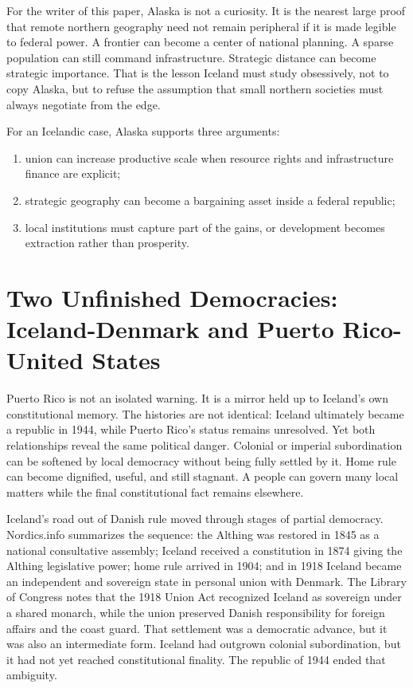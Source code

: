 \documentclass[11pt,a4paper]{article}
\begin{document}
For the writer of this paper, Alaska is not a curiosity. It is the nearest large proof that remote northern geography need not remain peripheral if it is made legible to federal power. A frontier can become a center of national planning. A sparse population can still command infrastructure. Strategic distance can become strategic importance. That is the lesson Iceland must study obsessively, not to copy Alaska, but to refuse the assumption that small northern societies must always negotiate from the edge.

For an Icelandic case, Alaska supports three arguments:

\begin{enumerate}
  \item union can increase productive scale when resource rights and infrastructure finance are explicit;
  \item strategic geography can become a bargaining asset inside a federal republic;
  \item local institutions must capture part of the gains, or development becomes extraction rather than prosperity.
\end{enumerate}

\section[Two Unfinished Democracies]{Two Unfinished Democracies: Iceland-Denmark and Puerto Rico-United States}
Puerto Rico is not an isolated warning. It is a mirror held up to Iceland's own constitutional memory. The histories are not identical: Iceland ultimately became a republic in 1944, while Puerto Rico's status remains unresolved. Yet both relationships reveal the same political danger. Colonial or imperial subordination can be softened by local democracy without being fully settled by it. Home rule can become dignified, useful, and still stagnant. A people can govern many local matters while the final constitutional fact remains elsewhere.

Iceland's road out of Danish rule moved through stages of partial democracy. Nordics.info summarizes the sequence: the Althing was restored in 1845 as a national consultative assembly; Iceland received a constitution in 1874 giving the Althing legislative power; home rule arrived in 1904; and in 1918 Iceland became an independent and sovereign state in personal union with Denmark.\cite{nordicsicelandhistory} The Library of Congress notes that the 1918 Union Act recognized Iceland as sovereign under a shared monarch, while the union preserved Danish responsibility for foreign affairs and the coast guard.\cite{locunionact} That settlement was a democratic advance, but it was also an intermediate form. Iceland had outgrown colonial subordination, but it had not yet reached constitutional finality. The republic of 1944 ended that ambiguity.
\end{document}
